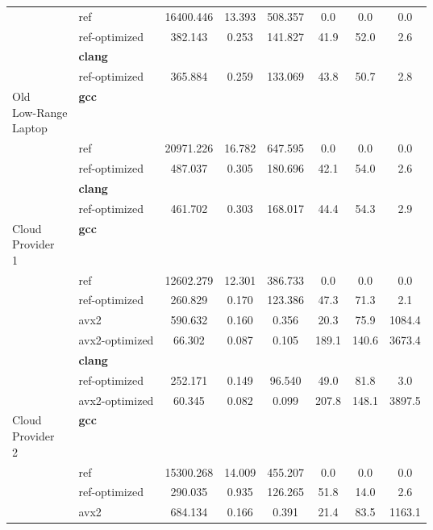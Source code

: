 \begin{table}[H]
\begin{tabularx}{\linewidth}{l l c c c c c c}
          & ref & 16400.446 & 13.393 & 508.357 & 0.0 & 0.0 & 0.0\\
          & ref-optimized & 382.143 & 0.253 & 141.827 & 41.9 & 52.0 & 2.6\\
          & \textbf{clang} & & & & & \\
          & ref-optimized & 365.884 & 0.259 & 133.069 & 43.8 & 50.7 & 2.8\\
          \midrule
          \multirowcell{5}{Old\\ Low-Range\\ Laptop}
          & \textbf{gcc} & & & & & \\
          & ref & 20971.226 & 16.782 & 647.595 & 0.0 & 0.0 & 0.0\\
          & ref-optimized & 487.037 & 0.305 & 180.696 & 42.1 & 54.0 & 2.6\\
          & \textbf{clang} & & & & & \\
          & ref-optimized & 461.702 & 0.303 & 168.017 & 44.4 & 54.3 & 2.9\\
          \midrule
          \multirowcell{8}{Cloud\\ Provider\\ 1}
          & \textbf{gcc} & & & & & \\
          & ref & 12602.279 & 12.301 & 386.733 & 0.0 & 0.0 & 0.0\\
          & ref-optimized & 260.829 & 0.170 & 123.386 & 47.3 & 71.3 & 2.1\\
          & avx2 & 590.632 & 0.160 & 0.356 & 20.3 & 75.9 & 1084.4\\
          & avx2-optimized & 66.302 & 0.087 & 0.105 & 189.1 & 140.6 & 3673.4\\
          & \textbf{clang} & & & & & \\
          & ref-optimized & 252.171 & 0.149 & 96.540 & 49.0 & 81.8 & 3.0\\
          & avx2-optimized & 60.345 & 0.082 & 0.099 & 207.8 & 148.1 & 3897.5\\
          \midrule
          \multirowcell{8}{Cloud\\ Provider\\ 2}
          & \textbf{gcc} & & & & & \\
          & ref & 15300.268 & 14.009 & 455.207 & 0.0 & 0.0 & 0.0\\
          & ref-optimized & 290.035 & 0.935 & 126.265 & 51.8 & 14.0 & 2.6\\
          & avx2 & 684.134 & 0.166 & 0.391 & 21.4 & 83.5 & 1163.1\\

\end{tabularx}
\end{table}
